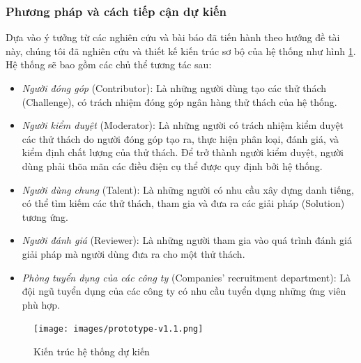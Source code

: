 \documentclass{article}[14pt]
\begin{document}
{        \subsubsection{Phương pháp và cách tiếp cận dự kiến}
            Dựa vào ý tưởng từ các nghiên cứu và bài báo đã tiến hành theo hướng đề tài này, chúng tôi đã nghiên cứu và thiết kế kiến trúc sơ bộ của hệ thống như hình \ref{fig:architect}. Hệ thống sẽ bao gồm các chủ thể tương tác sau: 
            \begin{itemize}
                \item \textit{Người đóng góp} (Contributor): Là những người dùng tạo các thử thách (Challenge), có trách nhiệm đóng góp ngân hàng thử thách của hệ thống.
                \item \textit{Người kiểm duyệt} (Moderator): Là những người có trách nhiệm kiểm duyệt các thử thách do người đóng góp tạo ra, thực hiện phân loại, đánh giá, và kiểm định chất lượng của thử thách. Để trở thành người kiểm duyệt, người dùng phải thõa mãn các điều điện cụ thể được quy định bởi hệ thống. 
                \item \textit{Người dùng chung} (Talent): Là những người có nhu cầu xây dựng danh tiếng, có thể tìm kiếm các thử thách, tham gia và đưa ra các giải pháp (Solution) tương ứng.
                \item \textit{Người đánh giá} (Reviewer): Là những người tham gia vào quá trình đánh giá giải pháp mà người dùng đưa ra cho một thử thách.
                \item \textit{Phòng tuyển dụng của các công ty} (Companies' recruitment department): Là đội ngũ tuyển dụng của các công ty có nhu cầu tuyển dụng những ứng viên phù hợp.
            \end{itemize}

            \begin{figure} [h!]
                \centering
                \texttt{[image: images/prototype-v1.1.png]}
                \caption{Kiến trúc hệ thống dự kiến}
                \label{fig:architect}
            \end{figure}

}
\end{document}
